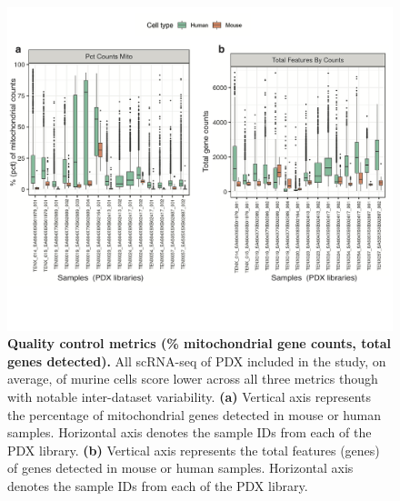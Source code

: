 \begin{figure}
\centering
\includegraphics[width=\textwidth]{Figures/chap3/mouseqc.png}
	
\caption[Quality control metrics (\% mitochondrial gene counts, total counts, total genes detected)]
	{\small
	\textbf{Quality control metrics (\% mitochondrial gene counts, total genes detected).}
	 All scRNA-seq of PDX included in the study, on average, of murine cells score lower across all three metrics though with notable inter-dataset variability.
	   \textbf{(a)} Vertical axis represents the percentage of mitochondrial genes detected in mouse or human samples. Horizontal axis denotes the sample IDs from each of the PDX library. 
	  \textbf{(b)} Vertical axis represents the total features (genes) of  genes detected in mouse or human samples. Horizontal axis denotes the sample IDs from each of the PDX library. 
	}
	\label{fig:mouseqc}
\end{figure}

